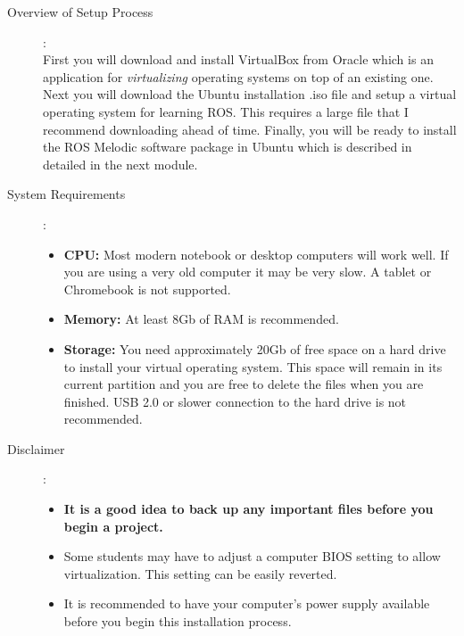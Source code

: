 \documentclass[12pt]{article}
\newcommand{\R}{\color{red}}
\begin{document}
\begin{description}
	\item[Overview of Setup Process]: \vspace{0mm} \\

		        First you will download and install VirtualBox from Oracle which is an application for {\it virtualizing} operating systems on top of an existing one. Next you will download the Ubuntu installation .iso file and setup a virtual operating system for learning ROS. This requires a large file that I recommend downloading ahead of time. Finally, you will be ready to install the ROS Melodic software package in Ubuntu which is described in detailed in the next module. 

	\item[System Requirements]: \vspace{0mm} \\

		        \begin{itemize}

					\item {\bf CPU:} Most modern notebook or desktop computers will work well. If you are using a very old computer it may be very slow. A tablet or Chromebook is not supported.
					\item {\bf Memory:} At least 8Gb of RAM is recommended.        
               
                    \item {\bf Storage:} You need approximately 20Gb of free space on a hard drive to install your virtual operating system. This space will remain in its current partition and you are free to delete the files when you are finished. USB 2.0 or slower connection to the hard drive is not recommended. 
    
                \end{itemize}
			\item[Disclaimer]: \begin{itemize}
			\item {\bf \R It is a good idea to back up any important files before you begin a project.} 
			\item Some students may have to adjust a computer BIOS setting to allow virtualization. This setting can be easily reverted.   
			\item It is recommended to have your computer's power supply available before you begin this installation process. 
			\end{itemize} 			
			
			
                    

\end{description}
\end{document}
